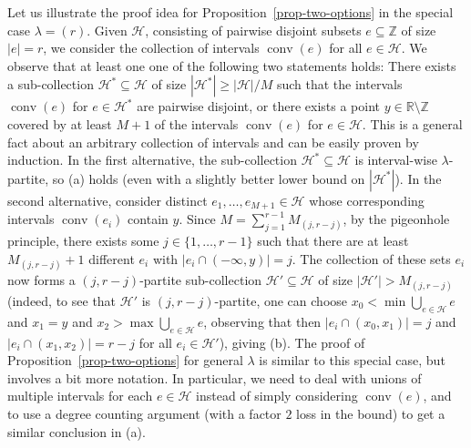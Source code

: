 \documentclass[11pt]{article}
\theoremstyle{definition}
\numberwithin{equation}{section}
\numberwithin{figure}{section}
\newcommand{\su}{\subseteq}
\newcommand{\Z}{\mathbb{Z}}
\newcommand{\HH}{\mathcal{H}}
\newcommand{\conv}{\operatorname{conv}}
\begin{document}
Let us illustrate the proof idea for Proposition~\ref{prop-two-options} in the special case $\lambda = (r)$. Given $\HH$, consisting of pairwise disjoint subsets $e\su \Z$ of size $|e|=r$, we consider the collection of intervals $\conv(e)$ for all $e \in \HH$. We observe that at least one one of the following two statements holds: There exists a sub-collection $\HH^*\su \HH$ of size $|\HH^*|\ge |\HH|/M$ such that the intervals $\conv(e)$ for $e\in \HH^*$ are pairwise disjoint, or there exists a point $y \in \mathbb R\setminus \Z$ covered by at least $M+1$ of the intervals $\conv(e)$ for $e\in \HH$. This is a general fact about an arbitrary collection of intervals and can be easily proven by induction. In the first alternative, the sub-collection $\HH^*\su \HH$ is interval-wise $\lambda$-partite, so (a) holds (even with a slightly better lower bound on $|\HH^*|$). In the second alternative, consider distinct $e_1, \ldots, e_{M+1}\in \HH$ whose corresponding intervals $\conv(e_i)$ contain $y$. Since $M = \sum_{j=1}^{r-1} M_{(j, r-j)}$, by the pigeonhole principle, there exists some $j \in \{1, \ldots, r-1\}$ such that there are at least $M_{(j, r-j)}+1$ different $e_i$ with $|e_i \cap (-\infty, y)| = j$. The collection of these sets $e_i$ now forms a $(j, r-j)$-partite sub-collection $\HH'\su \HH$ of size $|\HH'|>M_{(j, r-j)}$ (indeed, to see that $\HH'$ is $(j, r-j)$-partite, one can choose $x_0<\min \bigcup_{e\in \HH} e$ and $x_1=y$ and $x_2>\max \bigcup_{e\in \HH} e$, observing that then $|e_i \cap (x_0, x_1)| = j$ and $|e_i \cap (x_1, x_2)| = r-j$ for all $e_i\in \HH'$), giving (b). The proof of Proposition~\ref{prop-two-options} for general $\lambda$ is similar to this special case, but involves a bit more notation.  In particular, we need to deal with unions of multiple intervals for each $e\in \HH$ instead of simply considering $\conv(e)$, and to use a degree counting argument (with a factor $2$ loss in the bound) to get a similar conclusion in (a).
\end{document}
